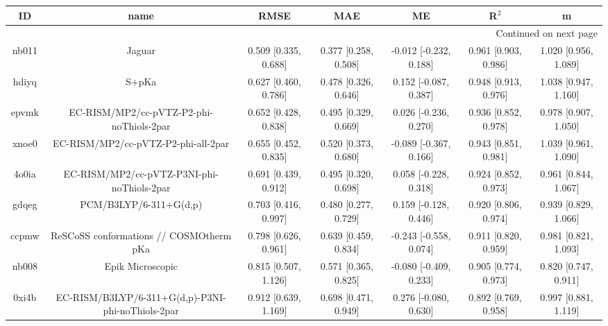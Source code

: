 \documentclass{article}
\begin{document}
\begin{center}
\begin{longtable}{|ccccccc|}
\toprule
    ID &                                               name &                  RMSE &                   MAE &                       ME &                 R$^2$ &                      m \\
\midrule
\endhead
\midrule
\multicolumn{7}{r}{{Continued on next page}} \\
\midrule
\endfoot

\bottomrule
\endlastfoot
 nb011 &                                             Jaguar &  0.509 [0.335, 0.688] &  0.377 [0.258, 0.508] &   -0.012 [-0.232, 0.188] &  0.961 [0.903, 0.986] &   1.020 [0.956, 1.089] \\
 hdiyq &                                              S+pKa &  0.627 [0.460, 0.786] &  0.478 [0.326, 0.646] &    0.152 [-0.087, 0.387] &  0.948 [0.913, 0.976] &   1.038 [0.947, 1.160] \\
 epvmk &           EC-RISM/MP2/cc-pVTZ-P2-phi-noThiols-2par &  0.652 [0.428, 0.838] &  0.495 [0.329, 0.669] &    0.026 [-0.236, 0.270] &  0.936 [0.852, 0.978] &   0.978 [0.907, 1.050] \\
 xnoe0 &                EC-RISM/MP2/cc-pVTZ-P2-phi-all-2par &  0.655 [0.452, 0.835] &  0.520 [0.373, 0.680] &   -0.089 [-0.367, 0.166] &  0.943 [0.851, 0.981] &   1.039 [0.961, 1.090] \\
 4o0ia &         EC-RISM/MP2/cc-pVTZ-P3NI-phi-noThiols-2par &  0.691 [0.439, 0.912] &  0.495 [0.320, 0.698] &    0.058 [-0.228, 0.318] &  0.924 [0.852, 0.973] &   0.961 [0.844, 1.067] \\
 gdqeg &                             PCM/B3LYP/6-311+G(d,p) &  0.703 [0.416, 0.997] &  0.480 [0.277, 0.729] &    0.159 [-0.128, 0.446] &  0.920 [0.806, 0.974] &   0.939 [0.829, 1.066] \\
 ccpmw &            ReSCoSS conformations // COSMOtherm pKa &  0.798 [0.626, 0.961] &  0.639 [0.459, 0.834] &   -0.243 [-0.558, 0.074] &  0.911 [0.820, 0.959] &   0.981 [0.821, 1.093] \\
 nb008 &                                   Epik Microscopic &  0.815 [0.507, 1.126] &  0.571 [0.365, 0.825] &   -0.080 [-0.409, 0.233] &  0.905 [0.774, 0.973] &   0.820 [0.747, 0.911] \\
 0xi4b &  EC-RISM/B3LYP/6-311+G(d,p)-P3NI-phi-noThiols-2par &  0.912 [0.639, 1.169] &  0.698 [0.471, 0.949] &    0.276 [-0.080, 0.630] &  0.892 [0.769, 0.958] &   0.997 [0.881, 1.119] \\

\end{longtable}
\end{center}
\end{document}
